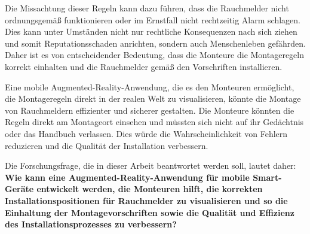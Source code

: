 Die Missachtung dieser Regeln kann dazu führen, dass die Rauchmelder nicht ordnungsgemäß funktionieren oder im Ernstfall nicht rechtzeitig Alarm schlagen. Dies kann unter Umständen nicht nur rechtliche Konsequenzen nach sich ziehen und somit Reputationsschaden anrichten, sondern auch Menschenleben gefährden. Daher ist es von entscheidender Bedeutung, dass die Monteure die Montageregeln korrekt einhalten und die Rauchmelder gemäß den Vorschriften installieren.

Eine mobile Augmented-Reality-Anwendung, die es den Monteuren ermöglicht, die Montageregeln direkt in der realen Welt zu visualisieren, könnte die Montage von Rauchmeldern effizienter und sicherer gestalten. Die Monteure könnten die Regeln direkt am Montageort einsehen und müssten sich nicht auf ihr Gedächtnis oder das Handbuch verlassen. Dies würde die Wahrscheinlichkeit von Fehlern reduzieren und die Qualität der Installation verbessern.

Die Forschungsfrage, die in dieser Arbeit beantwortet werden soll, lautet daher: \textbf{Wie kann eine Augmented-Reality-Anwendung für mobile Smart-Geräte entwickelt werden, die Monteuren hilft, die korrekten Installationspositionen für Rauchmelder zu visualisieren und so die Einhaltung der Montagevorschriften sowie die Qualität und Effizienz des Installationsprozesses zu verbessern?}

